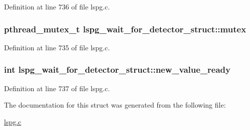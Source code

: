 Definition at line 736 of file lspg.\-c.

\hypertarget{structlspg__wait__for__detector__struct_a958e9fe59e671e61f95c2ce796ba24ce}{
\subsubsection[{mutex}]{\setlength{\rightskip}{0pt plus 5cm}pthread\-\_\-mutex\-\_\-t lspg\-\_\-wait\-\_\-for\-\_\-detector\-\_\-struct\-::mutex}}\label{structlspg__wait__for__detector__struct_a958e9fe59e671e61f95c2ce796ba24ce}


Definition at line 735 of file lspg.\-c.

\hypertarget{structlspg__wait__for__detector__struct_ad950e85c70c4473c5c7c40f8ceeae61d}{
\subsubsection[{new\-\_\-value\-\_\-ready}]{\setlength{\rightskip}{0pt plus 5cm}int lspg\-\_\-wait\-\_\-for\-\_\-detector\-\_\-struct\-::new\-\_\-value\-\_\-ready}}\label{structlspg__wait__for__detector__struct_ad950e85c70c4473c5c7c40f8ceeae61d}


Definition at line 737 of file lspg.\-c.



The documentation for this struct was generated from the following file\-:\begin{DoxyCompactItemize}
\item 
\hyperlink{lspg_8c}{lspg.\-c}\end{DoxyCompactItemize}
